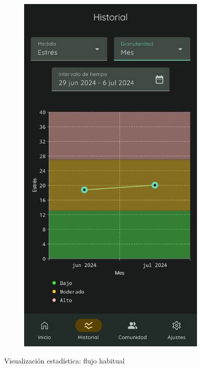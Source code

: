 \begin{figure}[htbp]
\begin{subfigure}[c]{0.4\textwidth}
                \end{subfigure}
                \hspace{0.1\textwidth}
                \begin{subfigure}[c]{0.4\textwidth}
                    \centering
                    \includegraphics[width=1\linewidth]{figures/pruebas/visualizacion_estadistica/Grafica estres mes.png}
                \end{subfigure}
                \caption{Visualización estadística: flujo habitual}
                \label{figure:pruebas:visualizacion_estadistica}
            \end{figure}
            
